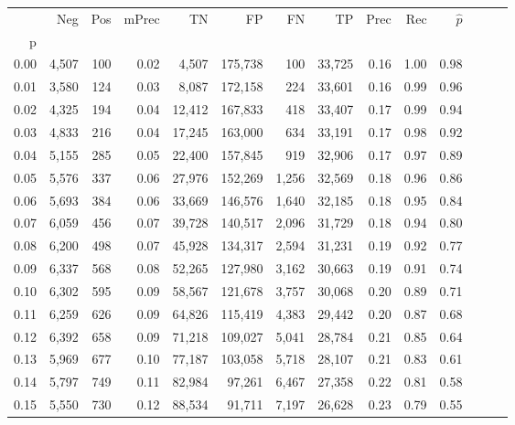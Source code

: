 \begin{tabular}{rrrrrrrrrrrrrr}
\toprule
{} &    Neg &  Pos & mPrec &       TN &       FP &      FN &      TP &  Prec &   Rec & $\hat{p}$ \\
p    &        &      &       &          &          &         &         &       &       &           \\
\midrule
0.00 &  4,507 &  100 &  0.02 &    4,507 &  175,738 &     100 &  33,725 &  0.16 &  1.00 &      0.98 \\
0.01 &  3,580 &  124 &  0.03 &    8,087 &  172,158 &     224 &  33,601 &  0.16 &  0.99 &      0.96 \\
0.02 &  4,325 &  194 &  0.04 &   12,412 &  167,833 &     418 &  33,407 &  0.17 &  0.99 &      0.94 \\
0.03 &  4,833 &  216 &  0.04 &   17,245 &  163,000 &     634 &  33,191 &  0.17 &  0.98 &      0.92 \\
0.04 &  5,155 &  285 &  0.05 &   22,400 &  157,845 &     919 &  32,906 &  0.17 &  0.97 &      0.89 \\
0.05 &  5,576 &  337 &  0.06 &   27,976 &  152,269 &   1,256 &  32,569 &  0.18 &  0.96 &      0.86 \\
0.06 &  5,693 &  384 &  0.06 &   33,669 &  146,576 &   1,640 &  32,185 &  0.18 &  0.95 &      0.84 \\
0.07 &  6,059 &  456 &  0.07 &   39,728 &  140,517 &   2,096 &  31,729 &  0.18 &  0.94 &      0.80 \\
0.08 &  6,200 &  498 &  0.07 &   45,928 &  134,317 &   2,594 &  31,231 &  0.19 &  0.92 &      0.77 \\
0.09 &  6,337 &  568 &  0.08 &   52,265 &  127,980 &   3,162 &  30,663 &  0.19 &  0.91 &      0.74 \\
0.10 &  6,302 &  595 &  0.09 &   58,567 &  121,678 &   3,757 &  30,068 &  0.20 &  0.89 &      0.71 \\
0.11 &  6,259 &  626 &  0.09 &   64,826 &  115,419 &   4,383 &  29,442 &  0.20 &  0.87 &      0.68 \\
0.12 &  6,392 &  658 &  0.09 &   71,218 &  109,027 &   5,041 &  28,784 &  0.21 &  0.85 &      0.64 \\
0.13 &  5,969 &  677 &  0.10 &   77,187 &  103,058 &   5,718 &  28,107 &  0.21 &  0.83 &      0.61 \\
0.14 &  5,797 &  749 &  0.11 &   82,984 &   97,261 &   6,467 &  27,358 &  0.22 &  0.81 &      0.58 \\
0.15 &  5,550 &  730 &  0.12 &   88,534 &   91,711 &   7,197 &  26,628 &  0.23 &  0.79 &      0.55 \\

\end{tabular}
